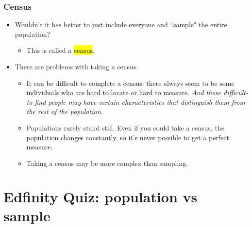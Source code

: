 \documentclass[slidestop,compress,mathserif]{beamer}
\begin{document}
\begin{frame}
	\frametitle{Census}

	\begin{itemize}

	\item Wouldn't it bes better to just include everyone and ``sample" the entire population? 

	\begin{itemize}
	\item This is called a \hl{census}.
	\end{itemize}

	\pause

	\item There are problems with taking a census:

	\begin{itemize}
	\item It can be difficult to complete a census: there always seem to be some individuals who are hard to locate or hard to measure. \textit{And these difficult-to-find people may have certain characteristics that distinguish them from the rest of the population.}
	\item Populations rarely stand still. Even if you could take a census, the population changes constantly, so it's never possible to get a perfect measure.
	\item Taking a census may be more complex than sampling.
	\end{itemize}

	\end{itemize}

\end{frame}

\section{Edfinity Quiz: population vs sample}
\end{document}
